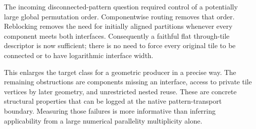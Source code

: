 The incoming disconnected-pattern question required control of a potentially
large global permutation order. Componentwise routing removes that order.
Reblocking removes the need for initially aligned partitions whenever every
component meets both interfaces. Consequently a faithful flat through-tile
descriptor is now sufficient; there is no need to force every original tile
to be connected or to have logarithmic interface width.

This enlarges the target class for a geometric producer in a precise way.
The remaining obstructions are components missing an interface, access to
private tile vertices by later geometry, and unrestricted nested reuse.
These are concrete structural properties that can be logged at the native
pattern-transport boundary. Measuring those failures is more informative than
inferring applicability from a large numerical parallelity multiplicity alone.
